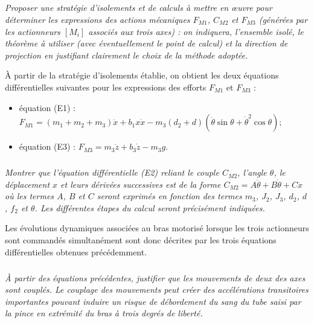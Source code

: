 \subparagraph{}
\textit{Proposer une stratégie d’isolements et de calculs à mettre en \oe{}uvre pour déterminer les expressions des
actions mécaniques $F_{M1}$, $C_{M2}$ et $F_{M3}$ (générées par les actionneurs $\left[ M_i \right]$ associés aux trois axes) : on indiquera, l’ensemble isolé, le théorème à utiliser (avec éventuellement le point de calcul) et la direction de projection en justifiant clairement le choix de la méthode adoptée.}
\ifprof
\begin{corrige}
\end{corrige}
\else
\fi

À partir de la stratégie d’isolements établie, on obtient les deux équations différentielles suivantes pour les
expressions des efforts $F_{M1}$ et $F_{M3}$ :
\begin{itemize}
\item équation (E1) : $F_{M1} = (m_1 + m_2 + m_3)\ddot{x} + b_1x\dot{x} - m_3\left( d_2 + d\right) \left(\ddot{\theta} \sin \theta +\dot{\theta}^2 \cos \theta \right)$;
\item équation (E3) : $F_{M3} = m_3\ddot{z}+b_3\dot{z}-m_3 g$.
\end{itemize}

\subparagraph{}
\textit{Montrer que l’équation différentielle (E2) reliant le couple $C_{M2}$, l’angle $\theta$, le déplacement $x$ et leurs dérivées
successives est de la forme $C_{M2}= A \ddot{\theta}+B\dot{\theta}+C\ddot{x}$ où les termes $A$, $B$ et $C$ seront exprimés en fonction des termes $m_3$, $J_2$, $J_3$, $d_2$, $d$, $f_2$ et $\theta$. Les différentes étapes du calcul seront précisément indiquées.}
\ifprof
\begin{corrige}
\end{corrige}
\else
\fi

Les évolutions dynamiques associées au bras motorisé lorsque les trois actionneurs sont commandés simultanément
sont donc décrites par les trois équations différentielles obtenues précédemment.




\subparagraph{}
\textit{À partir des équations précédentes, justifier que les mouvements de deux des axes sont couplés.
Le couplage des mouvements peut créer des accélérations transitoires importantes pouvant induire un risque de
débordement du sang du tube saisi par la pince en extrémité du bras à trois degrés de liberté.}
\ifprof
\begin{corrige}
\end{corrige}
\else
\fi
%
%
%
%
%
%
%
